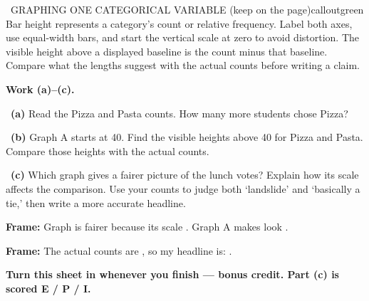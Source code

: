 \documentclass[11pt]{article}
\begin{document}
\begin{callout}{\IconBook\ GRAPHING ONE CATEGORICAL VARIABLE (keep on the page)}{calloutgreen}
Bar height represents a category's count or relative frequency. Label both axes, use equal-width bars, and start the vertical scale at zero to avoid distortion. The visible height above a displayed baseline is the count minus that baseline. Compare what the lengths suggest with the actual counts before writing a claim.
\end{callout}

\newpage
\textbf{Work (a)--(c).}\par\smallskip

~\textbf{(a)} Read the Pizza and Pasta counts. How many more students chose Pizza?\par
\workspace{0.7in}

~\textbf{(b)} Graph A starts at 40. Find the visible heights above 40 for Pizza and Pasta. Compare those heights with the actual counts.\par
\workspace{1.4in}

~\textbf{(c)} Which graph gives a fairer picture of the lunch votes? Explain how its scale affects the comparison. Use your counts to judge both `landslide' and `basically a tie,' then write a more accurate headline.\par
\workspace{2.0in}

\begin{sentenceframebox}\raggedright\textbf{Frame:} Graph \blank[0.4in] is fairer because its scale \blank[2in]. Graph A makes \blank[1.7in] look \blank[1in].\end{sentenceframebox}

\begin{sentenceframebox}\raggedright\textbf{Frame:} The actual counts are \blank[1.3in], so my headline is: \blank[2.7in].\end{sentenceframebox}

\textbf{Turn this sheet in whenever you finish --- bonus credit. Part (c) is scored E / P / I.}\par
\end{document}

